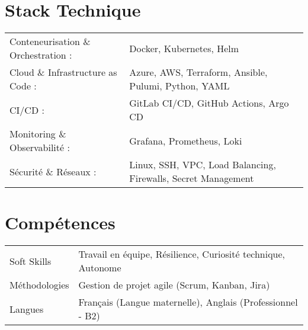 \documentclass[a4paper,11pt]{article}
\begin{document}
\section{Stack Technique}
\begin{tabularx}{\linewidth}{@{}l X@{}}
Conteneurisation \& Orchestration : & Docker, Kubernetes, Helm \\
Cloud \& Infrastructure as Code : & Azure, AWS, Terraform, Ansible, Pulumi, Python, YAML\\
CI/CD : & GitLab CI/CD, GitHub Actions, Argo CD \\
Monitoring \& Observabilité : & Grafana, Prometheus, Loki \\
Sécurité \& Réseaux : & Linux, SSH, VPC, Load Balancing, Firewalls, Secret Management \\
\end{tabularx}

\section{Compétences}
\begin{tabularx}{\linewidth}{@{}l X@{}}
Soft Skills & Travail en équipe, Résilience, Curiosité technique, Autonome \\
Méthodologies & Gestion de projet agile (Scrum, Kanban, Jira) \\
Langues & Français (Langue maternelle), Anglais (Professionnel - B2) \\
\end{tabularx}


\vfill
{}
\end{document}

